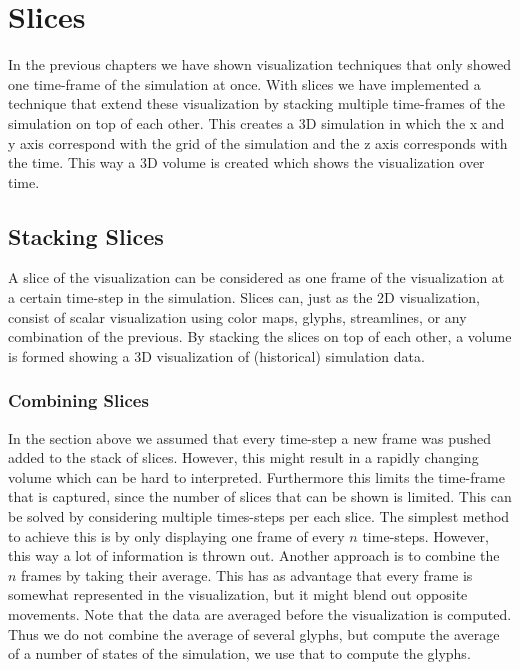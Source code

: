 \chapter{Slices} %
\label{cha:slices}
In the previous chapters we have shown visualization techniques that only showed one time-frame of the simulation at once. With slices we have implemented a technique that extend these visualization by stacking multiple time-frames of the simulation on top of each other. This creates a 3D simulation in which the x and y axis correspond with the grid of the simulation and the z axis corresponds with the time. This way a 3D volume is created which shows the visualization over time. 

\section{Stacking Slices} %
\label{sec:stacking_slices}
A slice of the visualization can be considered as one frame of the visualization at a certain time-step in the simulation. Slices can, just as the 2D visualization, consist of scalar visualization using color maps, glyphs, streamlines, or any combination of the previous. By stacking the slices on top of each other, a volume is formed showing a 3D visualization of (historical) simulation data. 

\subsection{Combining Slices} %
\label{sub:combining_slices}
In the section above we assumed that every time-step a new frame was pushed added to the stack of slices. However, this might result in a rapidly changing volume which can be hard to interpreted. Furthermore this limits the time-frame that is captured, since the number of slices that can be shown is limited. This can be solved by  considering multiple times-steps per each slice. The simplest method to achieve this is by only displaying one frame of every $n$ time-steps. However, this way a lot of information is thrown out. Another approach is to combine the $n$ frames by taking their average. This has as advantage that every frame is somewhat represented in the visualization, but it might blend out opposite movements. Note that the data are averaged before the visualization is computed. Thus we do not combine the average of several glyphs, but compute the average of a number of states of the simulation, we use that to compute the glyphs.

